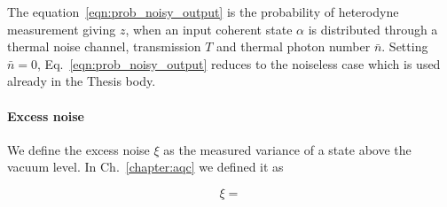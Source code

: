 The equation~\ref{eqn:prob_noisy_output} is the probability of heterodyne measurement giving $z$, when an input coherent state $\alpha$ is distributed through a thermal noise channel, transmission $T$ and thermal photon number $\bar{n}$. Setting $\bar{n}=0$, Eq.~\ref{eqn:prob_noisy_output} reduces to the noiseless case which is used already in the Thesis body.

\paragraph{Excess noise}
We define the excess noise $\xi$ as the measured variance of a state above the vacuum level. In Ch.~\ref{chapter:aqc} we defined it as

\begin{equation}
\xi = 
\end{equation}